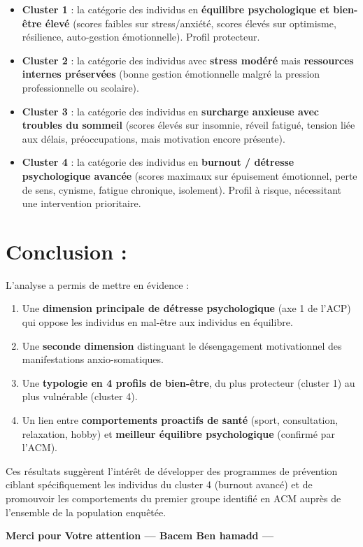 \documentclass[
]{article}
\providecommand{\tightlist}{%
  \setlength{\itemsep}{0pt}\setlength{\parskip}{0pt}}
\begin{document}
\begin{itemize}
\item
  \textbf{Cluster 1} : la catégorie des individus en \textbf{équilibre
  psychologique et bien-être élevé} (scores faibles sur stress/anxiété,
  scores élevés sur optimisme, résilience, auto-gestion émotionnelle).
  Profil protecteur.
\item
  \textbf{Cluster 2} : la catégorie des individus avec \textbf{stress
  modéré} mais \textbf{ressources internes préservées} (bonne gestion
  émotionnelle malgré la pression professionnelle ou scolaire).
\item
  \textbf{Cluster 3} : la catégorie des individus en \textbf{surcharge
  anxieuse avec troubles du sommeil} (scores élevés sur insomnie, réveil
  fatigué, tension liée aux délais, préoccupations, mais motivation
  encore présente).
\item
  \textbf{Cluster 4} : la catégorie des individus en \textbf{burnout /
  détresse psychologique avancée} (scores maximaux sur épuisement
  émotionnel, perte de sens, cynisme, fatigue chronique, isolement).
  Profil à risque, nécessitant une intervention prioritaire.
\end{itemize}

\hypertarget{conclusion}{%
\section{Conclusion :}\label{conclusion}}

L'analyse a permis de mettre en évidence :

\begin{enumerate}
\def\labelenumi{\arabic{enumi}.}
\tightlist
\item
  Une \textbf{dimension principale de détresse psychologique} (axe 1 de
  l'ACP) qui oppose les individus en mal-être aux individus en
  équilibre.
\item
  Une \textbf{seconde dimension} distinguant le désengagement
  motivationnel des manifestations anxio-somatiques.
\item
  Une \textbf{typologie en 4 profils de bien-être}, du plus protecteur
  (cluster 1) au plus vulnérable (cluster 4).
\item
  Un lien entre \textbf{comportements proactifs de santé} (sport,
  consultation, relaxation, hobby) et \textbf{meilleur équilibre
  psychologique} (confirmé par l'ACM).
\end{enumerate}

Ces résultats suggèrent l'intérêt de développer des programmes de
prévention ciblant spécifiquement les individus du cluster 4 (burnout
avancé) et de promouvoir les comportements du premier groupe identifié
en ACM auprès de l'ensemble de la population enquêtée.

\textbf{Merci pour Votre attention --- Bacem Ben hamadd ---}
\end{document}
